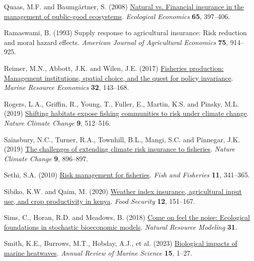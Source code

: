 \documentclass[
  letterpaper,
  DIV=11,
  numbers=noendperiod]{scrartcl}
\newlength{\cslhangindent}
\newlength{\cslentryspacingunit} %
\newenvironment{CSLReferences}[2] %
 {%
  \setlength{\parindent}{0pt}
  \ifodd #1
  \let\oldpar\par
  \def\par{\hangindent=\cslhangindent\oldpar}
  \fi
  \setlength{\parskip}{#2\cslentryspacingunit}
 }%
 {}
\theoremstyle{plain}
\theoremstyle{plain}
\theoremstyle{remark}
\begin{document}
\begin{CSLReferences}{1}{0}
\leavevmode{}%
Quaas, M.F. and Baumgärtner, S. (2008)
\href{https://doi.org/10.1016/j.ecolecon.2007.07.004}{Natural vs.
Financial insurance in the management of public-good ecosystems}.
\emph{Ecological Economics} \textbf{65}, 397--406.

\leavevmode{}%
Ramaswami, B. (1993) Supply response to agricultural insurance: Risk
reduction and moral hazard effects. \emph{American Journal of
Agricultural Economics} \textbf{75}, 914--925.

\leavevmode{}%
Reimer, M.N., Abbott, J.K. and Wilen, J.E. (2017)
\href{https://doi.org/10.1086/690678}{Fisheries production: Management
institutions, spatial choice, and the quest for policy invariance}.
\emph{Marine Resource Economics} \textbf{32}, 143--168.

\leavevmode{}%
Rogers, L.A., Griffin, R., Young, T., Fuller, E., Martin, K.S. and
Pinsky, M.L. (2019)
\href{https://doi.org/10.1038/s41558-019-0503-z}{Shifting habitats
expose fishing communities to risk under climate change}. \emph{Nature
Climate Change} \textbf{9}, 512--516.

\leavevmode{}%
Sainsbury, N.C., Turner, R.A., Townhill, B.L., Mangi, S.C. and Pinnegar,
J.K. (2019) \href{https://doi.org/10.1038/s41558-019-0645-z}{The
challenges of extending climate risk insurance to fisheries}.
\emph{Nature Climate Change} \textbf{9}, 896--897.

\leavevmode{}%
Sethi, S.A. (2010)
\href{https://doi.org/10.1111/j.1467-2979.2010.00363.x}{Risk management
for fisheries}. \emph{Fish and Fisheries} \textbf{11}, 341--365.

\leavevmode{}%
Sibiko, K.W. and Qaim, M. (2020)
\href{https://doi.org/10.1007/s12571-019-00987-y}{Weather index
insurance, agricultural input use, and crop productivity in kenya}.
\emph{Food Security} \textbf{12}, 151--167.

\leavevmode{}%
Sims, C., Horan, R.D. and Meadows, B. (2018)
\href{https://doi.org/10.1111/NRM.12191}{Come on feel the noise:
Ecological foundations in stochastic bioeconomic models}. \emph{Natural
Resource Modeling} \textbf{31}.

\leavevmode{}%
Smith, K.E., Burrows, M.T., Hobday, A.J., et al. (2023)
\href{https://doi.org/10.1146/annurev-marine-032122-121437}{Biological
impacts of marine heatwaves}. \emph{Annual Review of Marine Science}
\textbf{15}, 1--27.


\end{CSLReferences}
\end{document}
